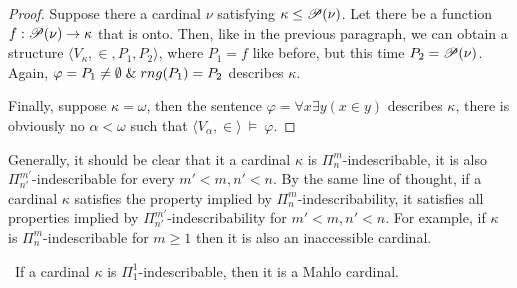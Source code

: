 \begin{proof}
Suppose there a cardinal $\nu$ satisfying $\kappa \leq \mathscr{P} (\nu)$. Let there be a function $f: \mathscr{P} (\nu) \rightarrow \kappa$ that is onto. Then, like in the previous paragraph, we can obtain a structure $\langle V_\kappa, \in, P_1, P_2 \rangle$, where $P_1 = f$ like before, but this time $P_2 = \mathscr{P} (\nu)$. Again, $\varphi = P_1 \neq \emptyset \mathrel{\&} rng(P_1) = P_2$ describes $\kappa$.

Finally, suppose $\kappa = \omega$, then the sentence $\varphi = \forall x \exists y (x \in y)$ describes $\kappa$, 
there is obviously no $\alpha < \omega$ such that $\langle V_\alpha, \in \rangle~\models~\varphi$.

\end{proof}

Generally, it should be clear that it a cardinal $\kappa$ is $\Pi^m_n$-indescribable, it is also $\Pi^{m'}_{n'}$-indescribable for every $m'<m, n'<n$. By the same line of thought, if a cardinal $\kappa$ satisfies the property implied by $\Pi^m_n$-indescribability, it satisfies all properties implied by $\Pi^{m'}_{n'}$-indescribability for $m'<m, n'<n$. For example, if $\kappa$ is $\Pi^m_n$-indescribable for $m \geq 1$ then it is also an inaccessible cardinal.


\begin{theorem}\
If a cardinal $\kappa$ is $\Pi^1_1$-indescribable, then it is a Mahlo cardinal.
\end{theorem}

